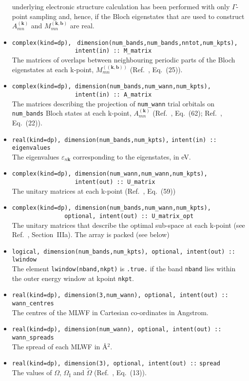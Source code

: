 \begin{itemize}
  underlying electronic structure calculation has been performed with
  only $\Gamma$-point sampling and, hence, if the Bloch eigenstates
  that are used to construct $A_{mn}^{(\mathbf{k})}$ and
  $M_{mn}^{\mathbf{(k,b)}}$ are real.
\item \verb#complex(kind=dp),#
      \verb# dimension(num_bands,num_bands,nntot,num_kpts),#\\
      \verb#                  intent(in) :: M_matrix#\\
      The matrices of overlaps between neighbouring periodic parts of
      the Bloch eigenstates at each k-point, $M_{mn}^{(\mathbf{(k,b)})}$
      (Ref.~\cite{marzari-prb97}, Eq.~(25)).
\item \verb#complex(kind=dp), dimension(num_bands,num_wann,num_kpts),#\\
      \verb#                  intent(in) :: A_matrix# \\The matrices
      describing the projection of \verb#num_wann# trial orbitals on
      \verb#num_bands# Bloch states at each k-point,
      $A_{mn}^{(\mathbf{k})}$ (Ref.~\cite{marzari-prb97}, Eq.~(62);
      Ref.~\cite{souza-prb01}, Eq.~(22)).
\item \verb#real(kind=dp), dimension(num_bands,num_kpts),#
      \verb#intent(in) :: eigenvalues#\\ The
      eigenvalues $\varepsilon_{n\mathbf{k}}$ corresponding to the
      eigenstates, in eV.
\item \verb#complex(kind=dp), dimension(num_wann,num_wann,num_kpts),#\\
      \verb#                  intent(out) :: U_matrix#\\ The unitary
      matrices at each k-point (Ref.~\cite{marzari-prb97}, Eq.~(59))
\item \verb#complex(kind=dp), dimension(num_bands,num_wann,num_kpts),#\\
      \verb#               optional, intent(out) :: U_matrix_opt#\\ The
      unitary matrices that describe the optimal sub-space at each
      k-point (see Ref.~\cite{souza-prb01}, Section~{\sc IIIa}). The array is
      packed (see below)
\item \verb#logical, dimension(num_bands,num_kpts), optional, intent(out) :: lwindow#\\
       The element \verb#lwindow(nband,nkpt)# is {\tt .true.} if the band
{\tt nband} lies within the outer energy window at kpoint {\tt nkpt}.
\item \verb#real(kind=dp), dimension(3,num_wann), optional, intent(out) :: wann_centres#\\
      The centres of the MLWF in Cartesian co-ordinates in Angstrom.
\item \verb#real(kind=dp), dimension(num_wann), optional, intent(out) :: wann_spreads#\\
      The spread of each MLWF in \AA$^{2}$.
\item \verb#real(kind=dp), dimension(3), optional, intent(out) ::#
      \verb#spread#\\
      The values of $\Omega$, $\Omega_{\mathrm{I}}$ and
      $\tilde{\Omega}$ (Ref.~\cite{marzari-prb97}, Eq.~(13)).
\end{itemize}

